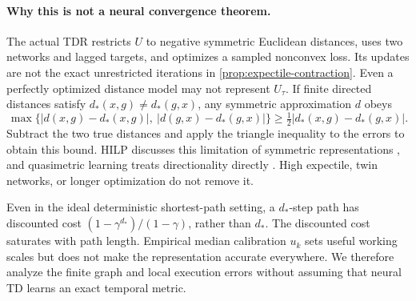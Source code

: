 \documentclass{article}
\theoremstyle{definition}
\theoremstyle{remark}
\begin{document}
\paragraph{Why this is not a neural convergence theorem.}
The actual TDR restricts $U$ to negative symmetric Euclidean distances, uses two
networks and lagged targets, and optimizes a sampled nonconvex loss.
Its updates are not the exact unrestricted iterations in
\cref{prop:expectile-contraction}. Even a perfectly optimized distance model may not
represent $U_\tau$. If finite directed distances satisfy
$d_*(x,g)\ne d_*(g,x)$, any symmetric approximation $d$ obeys
\[
 \max\{|d(x,g)-d_*(x,g)|,\ |d(g,x)-d_*(g,x)|\}
 \ge\tfrac12|d_*(x,g)-d_*(g,x)| .
\]
Subtract the two true distances and apply the triangle inequality to the errors to obtain
this bound. HILP discusses this limitation of symmetric representations \citep{hilp},
and quasimetric learning treats directionality directly \citep{qrl}.
High expectile, twin networks, or longer optimization do not remove it.

Even in the ideal deterministic shortest-path setting, a $d_*$-step path has discounted
cost $(1-\gamma^{d_*})/(1-\gamma)$, rather than $d_*$.
The discounted cost saturates with path length. Empirical median calibration
$u_k$ sets useful working scales but does not make the representation accurate everywhere.
We therefore analyze the finite graph and local execution errors without assuming
that neural TD learns an exact temporal metric.
\end{document}
